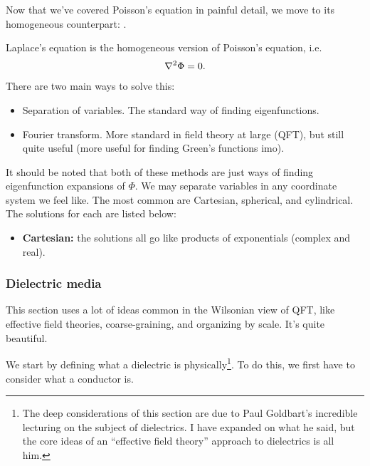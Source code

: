 \documentclass[11pt]{article}
\begin{document}
Now that we've covered Poisson's equation in painful
detail, we move to its homogeneous counterpart: .

\begin{iidea}
    Laplace's equation is the homogeneous version of Poisson's
    equation, i.e.
    \begin{align*}
        \nabla^2 \Phi = 0.
    \end{align*}
    There are two main ways to solve this:
    \begin{itemize}
        \item Separation of variables. The standard way of finding eigenfunctions.
        \item Fourier transform. More standard in field
        theory at large (QFT), but still quite useful
        (more useful for finding Green's functions imo).
    \end{itemize}
    It should be noted that both of these methods are just ways of
    finding eigenfunction expansions of $\Phi$. We may separate variables in 
    any coordinate system we feel like. The most common are Cartesian, spherical, 
    and cylindrical. The solutions for each are listed below:
    \begin{itemize}
        \item \textbf{Cartesian:} the solutions all go like products
        of exponentials (complex and real). 
    \end{itemize}
\end{iidea}

\subsubsection{Dielectric media}

\begin{reemark}
    This section uses a lot of ideas common in the Wilsonian
    view of QFT, like effective field theories, coarse-graining,
    and organizing by scale. It's quite beautiful.
\end{reemark}

We start by defining what a dielectric is physically\footnote{The
deep considerations of this section are due to Paul Goldbart's
incredible lecturing on the subject of dielectrics. I have expanded
on what he said, but the core ideas of an ``effective field theory''
approach to dielectrics is all him.}. To do this, we first have
to consider what a conductor is.
\end{document}
